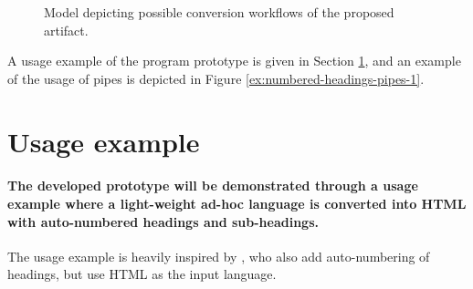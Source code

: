 \documentclass{scrreprt}
\begin{document}
\begin{figure}[h]
  \centering


  \caption{Model depicting possible conversion workflows of the proposed artifact.}
  \label{fig:model-of-conversion-prototype-artifact}
\end{figure}

A usage example of the program prototype is given in Section \ref{sec:usage-example}, and an example of the usage of pipes is depicted in Figure \ref{ex:numbered-headings-pipes-1}.














%
%



\section{Usage example}
\label{sec:usage-example}

\paragraph{The developed prototype will be demonstrated through a usage example where a light-weight ad-hoc language is converted into HTML with auto-numbered headings and sub-headings.} The usage example is heavily inspired by \citet{krijnen}, who also add auto-numbering of headings, but use HTML as the input language.
\end{document}
